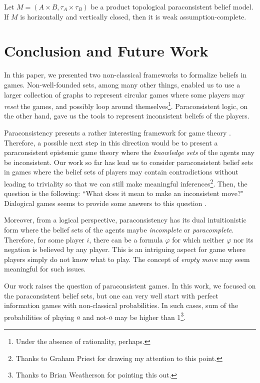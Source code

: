 \documentclass{article}
\begin{document}
\begin{thm}
Let $M = (A \times B, \tau_A \times \tau_B)$ be a product topological paraconsistent belief model. If $M$ is horizontally and vertically closed, then it is weak assumption-complete.
\end{thm}

\section{Conclusion and Future Work}

In this paper, we presented two non-classical frameworks to formalize beliefs in games. Non-well-founded sets, among many other things, enabled us to use a larger collection of graphs to represent circular games where some players may \emph{reset} the games, and possibly loop around themselves\footnote{Under the absence of rationality, perhaps.}. Paraconsistent logic, on the other hand, gave us the tools to represent inconsistent beliefs of the players.

Paraconsistency presents a rather interesting framework for game theory \cite{rah}. Therefore, a possible next step in this direction would be to present a paraconsistent epistemic game theory where the \emph{knowledge sets} of the agents may be inconsistent. Our work so far has lead us to consider paraconsistent belief sets in games where the belief sets of players may contain contradictions without leading to triviality so that we can still make meaningful inferences\footnote{Thanks to Graham Priest for drawing my attention to this point.}. Then, the question is the following: ``What does it mean to make an inconsistent move?" Dialogical games seems to provide some answers to this question \cite{rah}. 

Moreover, from a logical perspective, paraconsistency has its dual intuitionistic form where the belief sets of the agents maybe \emph{incomplete} or \emph{paracomplete}. Therefore, for some player $i$, there can be a formula $\varphi$ for which neither $\varphi$ nor its negation is believed by any player. This is an intriguing aspect for game where players simply do not know what to play. The concept of \emph{empty move} may seem meaningful for such issues.

Our work raises the question of paraconsistent games. In this work, we focused on the paraconsistent belief sets, but one can very well start with perfect information games with non-classical probabilities. In such cases, sum of the probabilities of playing $a$ and not-$a$ may be higher than 1\cite{wil0}\footnote{Thanks to Brian Weatherson for pointing this out.}. 
\end{document}
